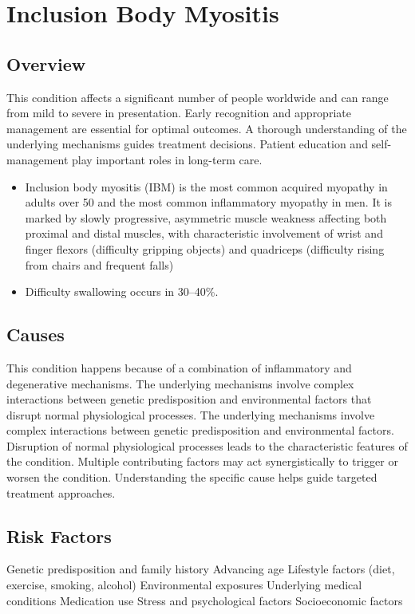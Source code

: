 \chapter{Inclusion Body Myositis}
\label{sec:Inclusion Body Myositis}

\section{Overview}
This condition affects a significant number of people worldwide and can range from mild to severe in presentation. Early recognition and appropriate management are essential for optimal outcomes. A thorough understanding of the underlying mechanisms guides treatment decisions. Patient education and self-management play important roles in long-term care.

\begin{itemize}[noitemsep]
  \item Inclusion body myositis (IBM) is the most common acquired myopathy in adults over 50 and the most common inflammatory myopathy in men. It is marked by slowly progressive, asymmetric muscle weakness affecting both proximal and distal muscles, with characteristic involvement of wrist and finger flexors (difficulty gripping objects) and quadriceps (difficulty rising from chairs and frequent falls)
  \item Difficulty swallowing occurs in 30--40\%.
\end{itemize}
\section{Causes}
This condition happens because of a combination of inflammatory and degenerative mechanisms. The underlying mechanisms involve complex interactions between genetic predisposition and environmental factors that disrupt normal physiological processes. The underlying mechanisms involve complex interactions between genetic predisposition and environmental factors. Disruption of normal physiological processes leads to the characteristic features of the condition. Multiple contributing factors may act synergistically to trigger or worsen the condition. Understanding the specific cause helps guide targeted treatment approaches.
\section{Risk Factors}
Genetic predisposition and family history Advancing age Lifestyle factors (diet, exercise, smoking, alcohol) Environmental exposures Underlying medical conditions Medication use Stress and psychological factors Socioeconomic factors

